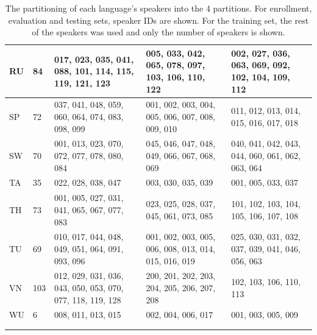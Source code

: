 \documentclass[bsc,frontabs,twoside,singlespacing,parskip,deptreport]{infthesis}
\begin{document}
{\begin{sc}
\begin{longtable}{p{0.5cm}|p{0.8cm}|p{3.9cm}|p{3.5cm}|p{3.5cm}}
      \hline
      RU & 84 & 017, 023, 035, 041, 088, 101, 114, 115, 119, 121, 123 & 005, 033, 042, 065, 078, 097, 103, 106, 110, 122 & 002, 027, 036, 063, 069, 092, 102, 104, 109, 112 \\
      \hline
      SP & 72 & 037, 041, 048, 059, 060, 064, 074, 083, 098, 099 & 001, 002, 003, 004, 005, 006, 007, 008, 009, 010 & 011, 012, 013, 014, 015, 016, 017, 018 \\
      \hline
      SW & 70 & 001, 013, 023, 070, 072, 077, 078, 080, 084 & 045, 046, 047, 048, 049, 066, 067, 068, 069 & 040, 041, 042, 043, 044, 060, 061, 062, 063, 064 \\
      \hline
      TA & 35 & 022, 028, 038, 047 & 003, 030, 035, 039 & 001, 005, 033, 037 \\
      \hline
      TH & 73 & 001, 005, 027, 031, 041, 065, 067, 077, 083 & 023, 025, 028, 037, 045, 061, 073, 085 & 101, 102, 103, 104, 105, 106, 107, 108 \\
      \hline
      TU & 69 & 010, 017, 044, 048, 049, 051, 064, 091, 093, 096 & 001, 002, 003, 005, 006, 008, 013, 014, 015, 016, 019 & 025, 030, 031, 032, 037, 039, 041, 046, 056, 063 \\
      \hline
      VN & 103 & 012, 029, 031, 036, 043, 050, 053, 070, 077, 118, 119, 128 & 200, 201, 202, 203, 204, 205, 206, 207, 208 & 102, 103, 106, 110, 113 \\
      \hline
      WU & 6 & 008, 011, 013, 015 & 002, 004, 006, 017 & 001, 003, 005, 009 \\
      \hline
      \multicolumn{3}{l}{} \\[-7pt]
      \caption{The partitioning of each language's speakers into the 4 partitions. For enrollment, evaluation and testing sets, speaker IDs are shown. For the training set, the rest of the speakers was used and only the number of speakers is shown.}
      \label{tab:partitioning}
    \end{longtable}
  \end{sc}
}
\end{document}
